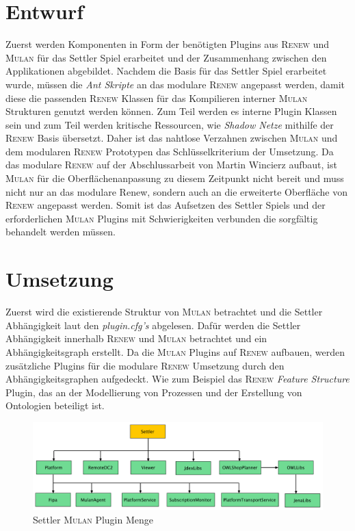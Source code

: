 \section{Entwurf}
	Zuerst werden Komponenten in Form der benötigten Plugins aus \textsc{Renew} und \textsc{Mulan} für das Settler Spiel erarbeitet und der Zusammenhang zwischen den Applikationen abgebildet.\bigbreak
	Nachdem die Basis für das Settler Spiel erarbeitet wurde, müssen die \textit{Ant Skripte} an das modulare \textsc{Renew} angepasst werden, damit diese die passenden \textsc{Renew} Klassen für das Kompilieren interner \textsc{Mulan} Strukturen genutzt werden können. Zum Teil werden es interne Plugin Klassen sein und zum Teil werden kritische Ressourcen, wie \textit{Shadow Netze} mithilfe der \textsc{Renew} Basis übersetzt. Daher ist das nahtlose Verzahnen zwischen \textsc{Mulan} und dem modularen \textsc{Renew} Prototypen das Schlüsselkriterium der Umsetzung. \bigbreak
	Da das modulare \textsc{Renew} auf der Abschlussarbeit von Martin Wincierz \cite{Wincierz18} aufbaut, ist \textsc{Mulan} für die Oberflächenanpassung zu diesem Zeitpunkt nicht bereit und muss nicht nur an das modulare Renew, sondern auch an die erweiterte Oberfläche von \textsc{Renew} angepasst werden.\newline
	Somit ist das Aufsetzen des Settler Spiels und der erforderlichen \textsc{Mulan} Plugins mit Schwierigkeiten verbunden die sorgfältig behandelt werden müssen. 

\section{Umsetzung}
	Zuerst wird die existierende Struktur von \textsc{Mulan} betrachtet und die Settler Abhängigkeit laut den \textit{plugin.cfg's} abgelesen. Dafür werden die Settler Abhängigkeit innerhalb \textsc{Renew} und \textsc{Mulan} betrachtet und ein Abhängigkeitsgraph erstellt. Da die \textsc{Mulan} Plugins auf \textsc{Renew} aufbauen, werden zusätzliche Plugins für die modulare \textsc{Renew} Umsetzung durch den Abhängigkeitsgraphen aufgedeckt. Wie zum Beispiel das \textsc{Renew} \textit{Feature Structure} Plugin, das an der Modellierung von Prozessen und der Erstellung von Ontologien beteiligt ist. \bigbreak

	\begin{figure}[h!]
	  \centering
	  \includegraphics[width=\textwidth]{material/images/settler-mulan-plugins.pdf}
	  \caption{Settler \textsc{Mulan} Plugin Menge}
	  \label{fig:settler_mulan_plugins}
	\end{figure}

